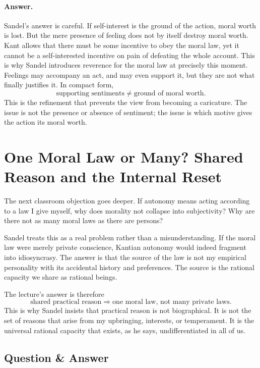 \paragraph{Answer.} Sandel's answer is careful. If self-interest is the ground of the action, moral worth is lost. But the mere presence of feeling does not by itself destroy moral worth. Kant allows that there must be some incentive to obey the moral law, yet it cannot be a self-interested incentive on pain of defeating the whole account. This is why Sandel introduces reverence for the moral law at precisely this moment. Feelings may accompany an act, and may even support it, but they are not what finally justifies it. In compact form,
\begin{equation}
\text{supporting sentiments} \neq \text{ground of moral worth}.
\end{equation}
This is the refinement that prevents the view from becoming a caricature. The issue is not the presence or absence of sentiment; the issue is which motive gives the action its moral worth.

\section{One Moral Law or Many? Shared Reason and the Internal Reset}

The next classroom objection goes deeper. If autonomy means acting according to a law I give myself, why does morality not collapse into subjectivity? Why are there not as many moral laws as there are persons?

Sandel treats this as a real problem rather than a misunderstanding. If the moral law were merely private conscience, Kantian autonomy would indeed fragment into idiosyncrasy. The answer is that the source of the law is not my empirical personality with its accidental history and preferences. The source is the rational capacity we share as rational beings.

The lecture's answer is therefore
\begin{equation}
\text{shared practical reason} \Longrightarrow \text{one moral law, not many private laws}.
\end{equation}
This is why Sandel insists that practical reason is not biographical. It is not the set of reasons that arise from my upbringing, interests, or temperament. It is the universal rational capacity that exists, as he says, undifferentiated in all of us.

\subsection{Question \& Answer}

